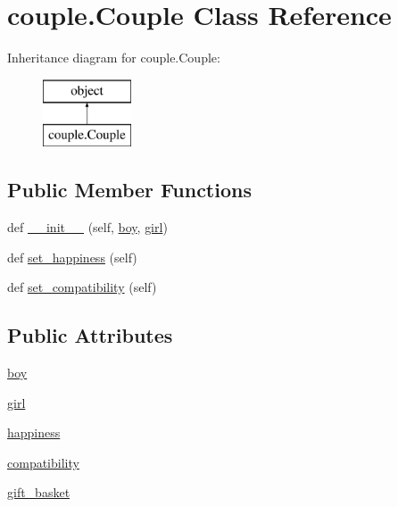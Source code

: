 \hypertarget{classcouple_1_1_couple}{}\section{couple.\+Couple Class Reference}
\label{classcouple_1_1_couple}
Inheritance diagram for couple.\+Couple\+:\begin{figure}[H]
\begin{center}
\leavevmode
\includegraphics[height=2.000000cm]{classcouple_1_1_couple}
\end{center}
\end{figure}
\subsection*{Public Member Functions}
\begin{DoxyCompactItemize}
\item 
def \hyperlink{classcouple_1_1_couple_a3cd6b67c48b545c1b51a8c11ac70677c}{\+\_\+\+\_\+init\+\_\+\+\_\+} (self, \hyperlink{classcouple_1_1_couple_a9add8e4c50bcbf4424339df43ed77df6}{boy}, \hyperlink{classcouple_1_1_couple_a99b4aa0aa5cd56aab0edebbba13e31b3}{girl})
\item 
def \hyperlink{classcouple_1_1_couple_a98db0e4bc5aa8bc81c3f5a2b05167c5f}{set\+\_\+happiness} (self)
\item 
def \hyperlink{classcouple_1_1_couple_a6557f9a740d1fc4750f3350e8138b0db}{set\+\_\+compatibility} (self)
\end{DoxyCompactItemize}
\subsection*{Public Attributes}
\begin{DoxyCompactItemize}
\item 
\hyperlink{classcouple_1_1_couple_a9add8e4c50bcbf4424339df43ed77df6}{boy}
\item 
\hyperlink{classcouple_1_1_couple_a99b4aa0aa5cd56aab0edebbba13e31b3}{girl}
\item 
\hyperlink{classcouple_1_1_couple_acfd8db3febb395596db4f5ab4ed53976}{happiness}
\item 
\hyperlink{classcouple_1_1_couple_a1b040704af8f391cacef5d15ef602717}{compatibility}
\item 
\hyperlink{classcouple_1_1_couple_a9cc14db20e8558bf7927df38789529a2}{gift\+\_\+basket}
\end{DoxyCompactItemize}


